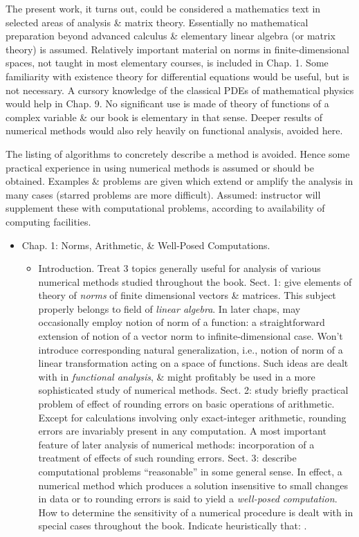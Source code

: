 \documentclass{article}
\begin{document}
\begin{enumerate}
	The present work, it turns out, could be considered a mathematics text in selected areas of analysis \& matrix theory. Essentially no mathematical preparation beyond advanced calculus \& elementary linear algebra (or matrix theory) is assumed. Relatively important material on norms in finite-dimensional spaces, not taught in most elementary courses, is included in Chap. 1. Some familiarity with existence theory for differential equations would be useful, but is not necessary. A cursory knowledge of the classical PDEs of mathematical physics would help in Chap. 9. No significant use is made of theory of functions of a complex variable \& our book is elementary in that sense. Deeper results of numerical methods would also rely heavily on functional analysis, avoided here.
	
	The listing of algorithms to concretely describe a method is avoided. Hence some practical experience in using numerical methods is assumed or should be obtained. Examples \& problems are given which extend or amplify the analysis in many cases (starred problems are more difficult). Assumed: instructor will supplement these with computational problems, according to availability of computing facilities.	
	\begin{itemize}
		\item {\sf Chap. 1: Norms, Arithmetic, \& Well-Posed Computations.}
		\begin{itemize}
			\item {\sf Introduction.} Treat 3 topics generally useful for analysis of various numerical methods studied throughout the book. Sect. 1: give elements of theory of {\it norms} of finite dimensional vectors \& matrices. This subject properly belongs to field of {\it linear algebra}. In later chaps, may occasionally employ notion of norm of a function: a straightforward extension of notion of a vector norm to infinite-dimensional case. Won't introduce corresponding natural generalization, i.e., notion of norm of a linear transformation acting on a space of functions. Such ideas are dealt with in {\it functional analysis}, \& might profitably be used in a more sophisticated study of numerical methods. Sect. 2: study briefly practical problem of effect of rounding errors on basic operations of arithmetic. Except for calculations involving only exact-integer arithmetic, rounding errors are invariably present in any computation. A most important feature of later analysis of numerical methods: incorporation of a treatment of effects of such rounding errors. Sect. 3: describe computational problems ``reasonable'' in some general sense. In effect, a numerical method which produces a solution insensitive to small changes in data or to rounding errors is said to yield a {\it well-posed computation}. How to determine the sensitivity of a numerical procedure is dealt with in special cases throughout the book. Indicate heuristically that: .

\end{itemize}
\end{itemize}
\end{enumerate}
\end{document}

